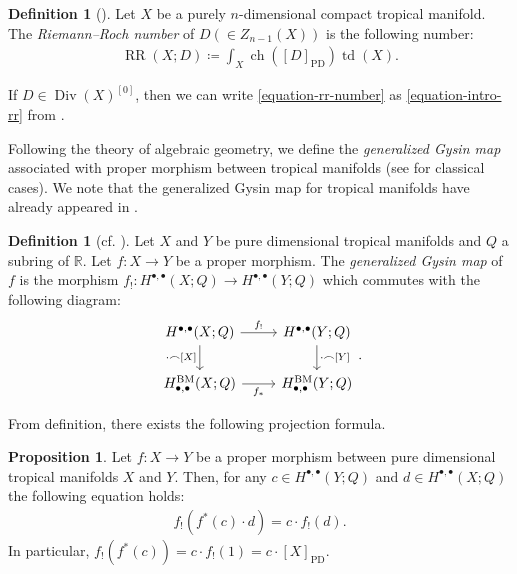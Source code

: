 \documentclass[a4paper,dvipdfmx,reqno,12pt]{amsart}
\theoremstyle{definition}
\newtheorem{definition}[theorem]{Definition}
\newtheorem{proposition}[theorem]{Proposition}
\newcommand{\deq}{\coloneqq}
\newcommand{\opn}[1]{\operatorname{#1}}
\newcommand{\PD}[1]{[#1]_{\mathrm{PD}}}
\numberwithin{equation}{section}
\begin{document}
\begin{definition}[{\cite[.(2)]{MR1335917}}]
\label{definition-rr-number}
Let $X$ be a purely $n$-dimensional
compact tropical manifold.
The \emph{Riemann--Roch number}
of $D(\in Z_{n-1}(X))$ is the following number:
\begin{align}
\label{equation-rr-number}
\opn{RR}(X;D)\deq \int_X \opn{ch}(\PD{D})\opn{td}(X).
\end{align}
\end{definition}
If $D\in \opn{Div}(X)^{[0]}$,
then we can write \cref{equation-rr-number}
as \cref{equation-intro-rr}
from \cite[Proposition 5.12]{MR4637248}.

Following the theory of algebraic geometry,
we define the \emph{generalized Gysin map}
associated with proper morphism between
tropical manifolds (see  
\cite[Chapter 13. Appendix]{MR2810322}
for classical cases).
We note that the generalized Gysin map
for tropical manifolds
have already appeared in \cite{amini2020hodge}.
\begin{definition}[{cf. \cite{amini2020hodge}}]
Let $X$ and $Y$ be pure dimensional tropical manifolds
and $Q$ a subring of $\mathbb{R}$.
Let $f\colon X\to Y$ be a proper morphism.
The \emph{generalized Gysin map} of $f$ is 
the morphism $f_!\colon H^{\bullet,\bullet}(X;Q)\to 
H^{\bullet,\bullet}(Y;Q)$
which commutes with the following diagram:
\begin{equation}
\begin{tikzcd}
	{H^{\bullet,\bullet}(X;Q)} & {H^{\bullet,\bullet}(Y;Q)} \\
	{H_{\bullet,\bullet}^{\mathrm{BM}}(X;Q)} & {H_{\bullet,\bullet}^{\mathrm{BM}}(Y;Q)}
	\arrow["{\cdot \frown [X]}"', from=1-1, to=2-1]
	\arrow["{\cdot\frown[Y]}", from=1-2, to=2-2]
	\arrow["{f_*}"', from=2-1, to=2-2]
	\arrow["{f_!}", from=1-1, to=1-2]
\end{tikzcd}.   
\end{equation}

\end{definition}
From definition, there exists the following projection formula.
\begin{proposition}
\label{equation-gysin-projection-formula}
Let $f\colon X\to Y$ be a proper morphism
between pure dimensional
tropical manifolds $X$ and $Y$.
Then, for any $c\in H^{\bullet,\bullet}(Y;Q) $ and
$d\in H^{\bullet,\bullet}(X;Q)$ the following equation holds:
\begin{align}
    f_!(f^{*}(c)\cdot d)=c\cdot f_!(d).
\end{align}
In particular, $f_!(f^{*}(c))=c\cdot f_!(1)=c\cdot \PD{X}$.
\end{proposition}
\end{document}
